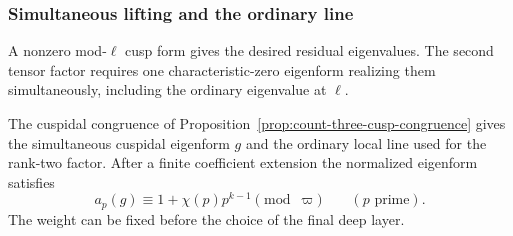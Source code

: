 \subsubsection{Simultaneous lifting and the ordinary line}

A nonzero mod-\(\ell\) cusp form gives the desired residual eigenvalues. The second tensor factor requires one characteristic-zero eigenform realizing them simultaneously, including the ordinary eigenvalue at \(\ell\).

\begin{proposition}\label{prop:count-three-cuspidal-eigensystem}
The cuspidal congruence of Proposition~\ref{prop:count-three-cusp-congruence}
gives the simultaneous cuspidal eigenform \(g\) and the ordinary local line used for the rank-two factor. After a finite coefficient extension the normalized eigenform satisfies 
\[
 a_p(g)\equiv1+\chi(p)p^{k-1}\pmod{\varpi}\qquad(p\text{ prime}).
\]
 The weight can be
fixed before the choice of the final deep layer.
\end{proposition}

